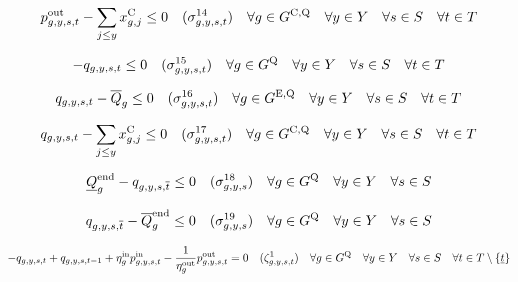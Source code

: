 \documentclass{article}
\newcommand{\sScenarioSets}{\quad \forall \iYear \in \sYears \quad \forall \iScenario \in \sScenarios \quad \forall \iInterval \in \sIntervals}
\begin{document}
\begin{equation}
	\vPowerOut - \sum\limits_{\iYearAlias \leq \iYear} \vInstalledCapacity[\iGenerator,\iYearAlias] \leq 0 \quad (\dMaxDischargingRateCandidate) \quad \forall \iGenerator \in \sStorageCandidate \sScenarioSets
\end{equation}

\begin{equation}
	- \vStorageUnitEnergy \leq 0 \quad (\dNonNegativeStorageEnergy) \quad \forall \iGenerator \in \sStorage \sScenarioSets
\end{equation}

\begin{equation}
	\vStorageUnitEnergy - \cStorageUnitEnergyMax \leq 0 \quad (\dMaxStorageEnergyExisting) \quad \forall \iGenerator \in \sStorageExisting \sScenarioSets
\end{equation}

\begin{equation}
	\vStorageUnitEnergy - \sum\limits_{\iYearAlias \leq \iYear} \vInstalledCapacity[\iGenerator,\iYearAlias] \leq 0 \quad (\dMaxStorageEnergyCandidate) \quad \forall \iGenerator \in \sStorageCandidate \sScenarioSets
\end{equation}

\begin{equation}
	\cStorageUnitEnergyIntervalEndMin - \vStorageUnitEnergy[\iGenerator,\iYear,\iScenario,\iIntervalTerminal]\leq  0 \quad (\dMinStorageEnergyIntervalEnd) \quad \forall \iGenerator \in \sStorage \quad \forall \iYear \in \sYears \quad \forall \iScenario \in \sScenarios
\end{equation}

\begin{equation}
	\vStorageUnitEnergy[\iGenerator,\iYear,\iScenario,\iIntervalTerminal] - \cStorageUnitEnergyIntervalEndMax \leq  0 \quad (\dMaxStorageEnergyIntervalEnd) \quad \forall \iGenerator \in \sStorage \quad \forall \iYear \in \sYears \quad \forall \iScenario \in \sScenarios
\end{equation}

\begin{equation}
	- \vStorageUnitEnergy + \vStorageUnitEnergy[\iGenerator,\iYear,\iScenario,\iInterval-1] + \cStorageUnitEfficiencyCharging \vPowerIn - \frac{1}{\cStorageUnitEfficiencyDischarging} \vPowerOut = 0 \quad (\dStorageEnergyTransition) \quad \forall \iGenerator \in \sStorage \sScenarioSets \setminus \{\iIntervalStart\}
\end{equation}
\end{document}
